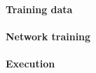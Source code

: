 \documentclass[a4paper]{article}
\begin{document}
		\paragraph{Training data}
		\paragraph{Network training}
		\paragraph{Execution}

	
%
%
%
%
%
%
%
%
%
%
\end{document}

